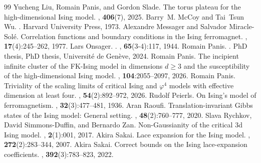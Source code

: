 \documentclass[10pt,a4paper]{amsart}
\numberwithin{equation}{section}
\begin{document}
\begin{thebibliography}{99}
 Yucheng Liu, Romain Panis, and Gordon Slade. \newblock The torus plateau for the high-dimensional {I}sing model. , \textbf{406}(7), 2025.
 Barry~M. McCoy and Tai~Tsun Wu. . \newblock Harvard University Press, 1973.
 Alexandre Messager and Salvador Miracle-Solé. \newblock Correlation functions and boundary conditions in the {I}sing ferromagnet. , \textup{\textbf{17}}(4):245--262, 1977.
 Lars Onsager. . , \textbf{65}(3-4):117, 1944.
 Romain Panis. . \newblock PhD thesis, PhD thesis, Universit{\'e} de Gen{\`e}ve, 2024.
 Romain Panis. \newblock The incipient infinite cluster of the {FK}-{I}sing model in dimensions $d\geq 3$ and the susceptibility of the high-dimensional {I}sing model. , {\bf 104}:2055--2097, 2026.
 Romain Panis. \newblock Triviality of the scaling limits of critical {I}sing and $\varphi^4$ models with effective dimension at least four. , {\bf 54}(2):892--972, 2026.
 Rudolf Peierls. \newblock On {I}sing's model of ferromagnetism. , \textbf{32}(3):477--481, 1936.
 Aran Raoufi. \newblock Translation-invariant {G}ibbs states of the {I}sing model: {G}eneral setting. , \textbf{48}(2):760--777, 2020.
 Slava Rychkov, David Simmons-Duffin, and Bernardo Zan. \newblock Non-{G}aussianity of the critical 3d {I}sing model. , \textbf{2}(1):001, 2017.
 Akira Sakai. \newblock Lace expansion for the {I}sing model. , \textbf{272}(2):283--344, 2007.
 Akira Sakai. \newblock Correct bounds on the {I}sing lace-expansion coefficients. , \textbf{392}(3):783--823, 2022.

\end{thebibliography}
\end{document}
